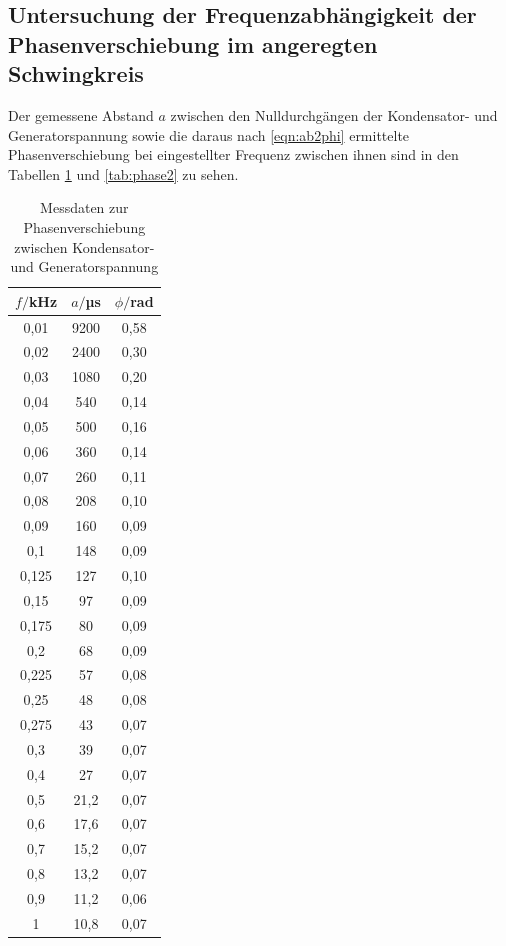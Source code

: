 \subsection{Untersuchung der Frequenzabhängigkeit der Phasenverschiebung im angeregten Schwingkreis}

Der gemessene Abstand $a$ zwischen den Nulldurchgängen der Kondensator- und Generatorspannung
sowie die daraus nach \eqref{eqn:ab2phi} ermittelte Phasenverschiebung bei eingestellter Frequenz zwischen ihnen sind
in den Tabellen \ref{tab:phase1} und \ref{tab:phase2} zu sehen.

\begin{table}
\centering
\caption{Messdaten zur Phasenverschiebung zwischen Kondensator- und Generatorspannung}
\label{tab:phase1}
\begin{tabular}{c c c}
\toprule
$f/$kHz & $a/$µs & $\phi/$rad \\
\midrule
 0,01	 & 9200    & 0,58 \\
 0,02	 & 2400    & 0,30 \\
 0,03	 & 1080    & 0,20 \\
 0,04	 &  540    & 0,14 \\
 0,05	 &  500    & 0,16 \\
 0,06	 &  360    & 0,14 \\
 0,07	 &  260    & 0,11 \\
 0,08	 &  208    & 0,10 \\
 0,09	 &  160    & 0,09 \\
 0,1	 &  148    & 0,09 \\
 0,125 &  127    & 0,10 \\
 0,15	 &   97    & 0,09 \\
 0,175 &   80    & 0,09 \\
 0,2	 &   68    & 0,09 \\
 0,225 &   57    & 0,08 \\
 0,25	 &   48    & 0,08 \\
 0,275 &   43    & 0,07 \\
 0,3	 &   39    & 0,07 \\
 0,4	 &   27    & 0,07 \\
 0,5	 &   21,2  & 0,07 \\
 0,6	 &   17,6  & 0,07 \\
 0,7	 &   15,2  & 0,07 \\
 0,8	 &   13,2  & 0,07 \\
 0,9	 &   11,2  & 0,06 \\
 1	   &   10,8  & 0,07 \\

\end{tabular}
\end{table}
